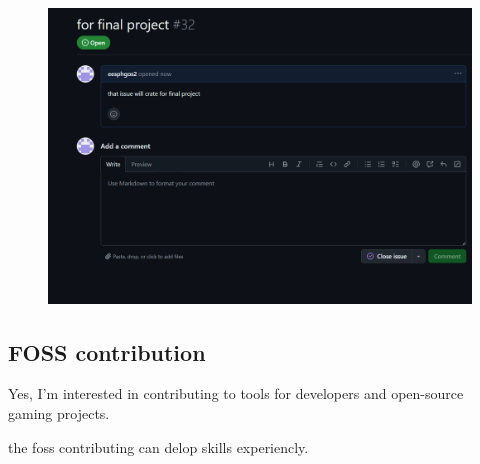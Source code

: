 \documentclass{article}
\begin{document}
\begin{figure}[h]
    \centering
    \includegraphics[width=1\linewidth]{Screenshot 2025-01-20 092658}
    \label{}
\end{figure}

\subsection{FOSS contribution}

Yes, I’m interested in contributing to tools for developers and open-source gaming projects.

the foss contributing can delop skills experiencly.
\end{document}

